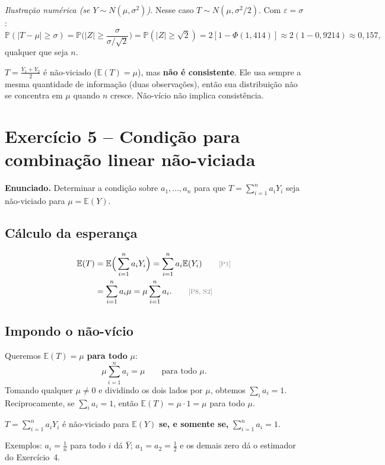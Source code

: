 \documentclass[11pt,a4paper]{article}
\newcommand{\E}{\mathbb{E}}
\newcommand{\Prob}{\mathbb{P}}
\newcommand{\bY}{\bar{Y}}
\newcommand{\just}[1]{\tag*{\footnotesize\textcolor{gray}{[#1]}}}
\begin{document}
\textit{Ilustração numérica (se $Y\sim N(\mu,\sigma^2)$).} Nesse caso $T\sim N(\mu,\sigma^2/2)$. Com $\varepsilon=\sigma$:
\[
\Prob(|T-\mu|\ge\sigma)=\Prob\Big(|Z|\ge\frac{\sigma}{\sigma/\sqrt2}\Big)=\Prob(|Z|\ge\sqrt2)=2[1-\Phi(1{,}414)]\approx2(1-0{,}9214)\approx0{,}157,
\]
qualquer que seja $n$.

\begin{resposta}
$T=\frac{Y_1+Y_2}{2}$ é não-viciado ($\E(T)=\mu$), mas \textbf{não é consistente}. Ele usa sempre a mesma quantidade de informação (duas observações), então sua distribuição não se concentra em $\mu$ quando $n$ cresce. Não-vício não implica consistência.
\end{resposta}

\section{Exercício 5 -- Condição para combinação linear não-viciada}

\textbf{Enunciado.} Determinar a condição sobre $a_1,\dots,a_n$ para que $T=\sum_{i=1}^na_iY_i$ seja não-viciado para $\mu=\E(Y)$.

\subsection*{Cálculo da esperança}
\begin{align*}
\E(T)&=\E\Big(\sum_{i=1}^na_iY_i\Big)=\sum_{i=1}^na_i\E(Y_i) \just{P1}\\
&=\sum_{i=1}^na_i\mu=\mu\sum_{i=1}^na_i . \just{P8, S2}
\end{align*}

\subsection*{Impondo o não-vício}
Queremos $\E(T)=\mu$ \textbf{para todo} $\mu$:
\[
\mu\sum_{i=1}^na_i=\mu\qquad\text{para todo }\mu .
\]
Tomando qualquer $\mu\neq0$ e dividindo os dois lados por $\mu$, obtemos $\sum_ia_i=1$. Reciprocamente, se $\sum_ia_i=1$, então $\E(T)=\mu\cdot1=\mu$ para todo $\mu$.

\begin{resposta}
$T=\sum_{i=1}^na_iY_i$ é não-viciado para $\E(Y)$ \textbf{se, e somente se,} $\displaystyle\sum_{i=1}^na_i=1$.

Exemplos: $a_i=\frac1n$ para todo $i$ dá $\bY$; $a_1=a_2=\frac12$ e os demais zero dá o estimador do Exercício~4.
\end{resposta}
\end{document}
